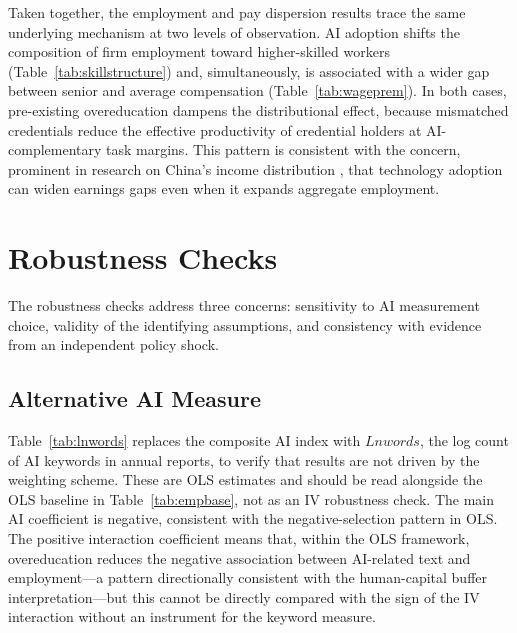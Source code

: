 \documentclass[12pt,a4paper]{article}
\theoremstyle{predstyle}
\theoremstyle{plain}
\begin{document}
Taken together, the employment and pay dispersion results trace the same underlying mechanism at two levels of observation. AI adoption shifts the composition of firm employment toward higher-skilled workers (Table~\ref{tab:skillstructure}) and, simultaneously, is associated with a wider gap between senior and average compensation (Table~\ref{tab:wageprem}). In both cases, pre-existing overeducation dampens the distributional effect, because mismatched credentials reduce the effective productivity of credential holders at AI-complementary task margins. This pattern is consistent with the concern, prominent in research on China's income distribution \citep{knight2014}, that technology adoption can widen earnings gaps even when it expands aggregate employment.

\section{Robustness Checks}
\label{sec:robust}

The robustness checks address three concerns: sensitivity to AI measurement choice, validity of the identifying assumptions, and consistency with evidence from an independent policy shock.

\subsection{Alternative AI Measure}

Table~\ref{tab:lnwords} replaces the composite AI index with \(Lnwords\), the log count of AI keywords in annual reports, to verify that results are not driven by the weighting scheme. These are OLS estimates and should be read alongside the OLS baseline in Table~\ref{tab:empbase}, not as an IV robustness check. The main AI coefficient is negative, consistent with the negative-selection pattern in OLS. The positive interaction coefficient means that, within the OLS framework, overeducation reduces the negative association between AI-related text and employment---a pattern directionally consistent with the human-capital buffer interpretation---but this cannot be directly compared with the sign of the IV interaction without an instrument for the keyword measure.
\end{document}
